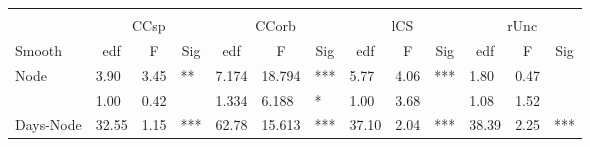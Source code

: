 \begin{tabular}{lllllllllllll}
 &  &  &  &  &  &  &  &  &  &  &  &  \\
 & \multicolumn{3}{c|}{CCsp} & \multicolumn{3}{c|}{CCorb} & \multicolumn{3}{c|}{lCS} & \multicolumn{3}{c}{rUnc} \\ \cline{2-13}
Smooth & \multicolumn{1}{c}{edf} & \multicolumn{1}{c}{F} & \multicolumn{1}{c|}{Sig} & \multicolumn{1}{c}{edf} & \multicolumn{1}{c}{F} & \multicolumn{1}{c|}{Sig} & \multicolumn{1}{c}{edf} & \multicolumn{1}{c}{F} & \multicolumn{1}{c|}{Sig} & \multicolumn{1}{c}{edf} & \multicolumn{1}{c}{F} & \multicolumn{1}{c}{Sig} \\ \hline
\multicolumn{1}{l|}{Node} & 3.90 & 3.45 & \multicolumn{1}{l|}{**} & 7.174 & 18.794 & \multicolumn{1}{l|}{***} & 5.77 & 4.06 & \multicolumn{1}{l|}{***} & 1.80 & 0.47 &  \\
\rowcolor[HTML]{C0C0C0}
\multicolumn{1}{l|}{\cellcolor[HTML]{C0C0C0}Days} & 1.00 & 0.42 & \multicolumn{1}{l|}{\cellcolor[HTML]{C0C0C0}} & 1.334 & 6.188 & \multicolumn{1}{l|}{\cellcolor[HTML]{C0C0C0}*} & 1.00 & 3.68 & \multicolumn{1}{l|}{\cellcolor[HTML]{C0C0C0}} & 1.08 & 1.52 &  \\
\multicolumn{1}{l|}{Days-Node} & 32.55 & 1.15 & \multicolumn{1}{l|}{***} & 62.78 & 15.613 & \multicolumn{1}{l|}{***} & 37.10 & 2.04 & \multicolumn{1}{l|}{***} & 38.39 & 2.25 & ***
\end{tabular}
